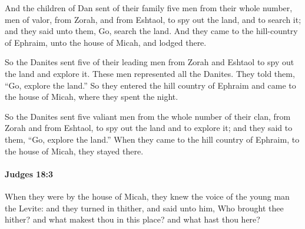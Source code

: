 			\begin{versebox}
					\item[BHS] 
					\item[ASV] And the children of Dan sent of their family five men from their whole number, men of valor, from Zorah, and from Eshtaol, to spy out the land, and to search it; and they said unto them, Go, search the land. And they came to the hill-country of Ephraim, unto the house of Micah, and lodged there.
					\item[NIV] So the Danites sent five of their leading men from Zorah and Eshtaol to spy out the land and explore it. These men represented all the Danites. They told them, “Go, explore the land.” So they entered the hill country of Ephraim and came to the house of Micah, where they spent the night.
					\item[NRSV] So the Danites sent five valiant men from the whole number of their clan, from Zorah and from Eshtaol, to spy out the land and to explore it; and they said to them, “Go, explore the land.” When they came to the hill country of Ephraim, to the house of Micah, they stayed there.
			\end{versebox}

		\paragraph{Judges 18:3} %
			\label{JUDGES-18-3}

			When they were by the house of Micah, they knew the voice of the young man the Levite: and they turned in thither, and said unto him, Who brought thee hither? and what makest thou in this place? and what hast thou here?

